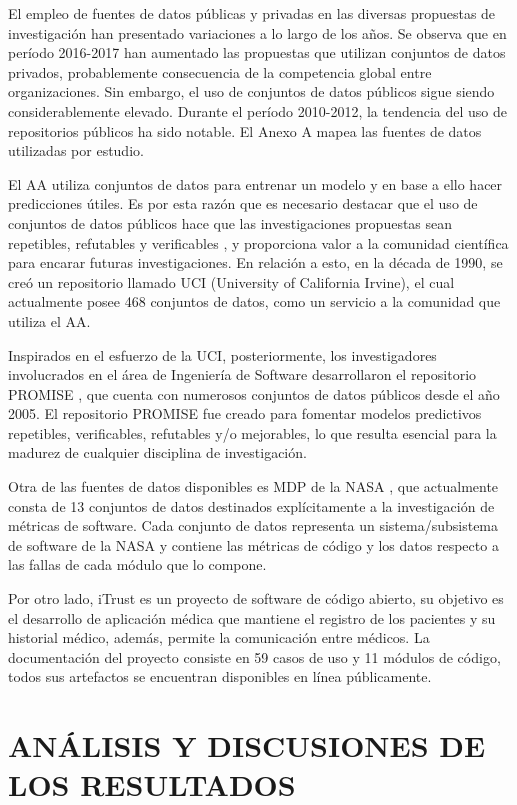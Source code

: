 \documentclass[journal]{IEEEtran}
\begin{document}
El empleo de fuentes de datos públicas y privadas en las diversas propuestas de investigación han presentado variaciones a lo largo de los años. Se observa que en período 2016-2017 han aumentado las propuestas que utilizan conjuntos de datos privados, probablemente consecuencia de la competencia global entre organizaciones. Sin embargo, el uso de conjuntos de datos públicos sigue siendo considerablemente elevado. Durante el período 2010-2012, la tendencia del uso de repositorios públicos ha sido notable. El Anexo A mapea las fuentes de datos utilizadas por estudio.

El AA utiliza conjuntos de datos para entrenar un modelo y en base a ello hacer predicciones útiles. Es por esta razón que es necesario destacar que el uso de conjuntos de datos públicos hace que las investigaciones propuestas sean repetibles, refutables y verificables \cite{Catal2009}, y proporciona valor a la comunidad científica para encarar futuras investigaciones. En relación a esto, en la década de 1990, se creó un repositorio llamado UCI  (University of California Irvine), el cual actualmente posee 468 conjuntos de datos, como un servicio a la comunidad que utiliza el AA. 

Inspirados en el esfuerzo de la UCI, posteriormente, los investigadores involucrados en el área de Ingeniería de Software desarrollaron el repositorio PROMISE , que cuenta con numerosos conjuntos de datos públicos desde el año 2005. El repositorio PROMISE fue creado para fomentar modelos predictivos repetibles, verificables, refutables y/o mejorables, lo que resulta esencial para la madurez de cualquier disciplina de investigación. 

Otra de las fuentes de datos disponibles es MDP de la NASA , que actualmente consta de 13 conjuntos de datos destinados explícitamente a la investigación de métricas de software. Cada conjunto de datos representa un sistema/subsistema de software de la NASA y contiene las métricas de código y los datos respecto a las fallas de cada módulo que lo compone.

Por otro lado, iTrust  es un proyecto de software de código abierto, su objetivo es el desarrollo de aplicación médica que mantiene el registro de los pacientes y su historial médico, además, permite la comunicación entre médicos. La documentación del proyecto consiste en 59 casos de uso y 11 módulos de código, todos sus artefactos se encuentran disponibles en línea públicamente. 

\section{ANÁLISIS Y DISCUSIONES DE LOS RESULTADOS}
\end{document}
